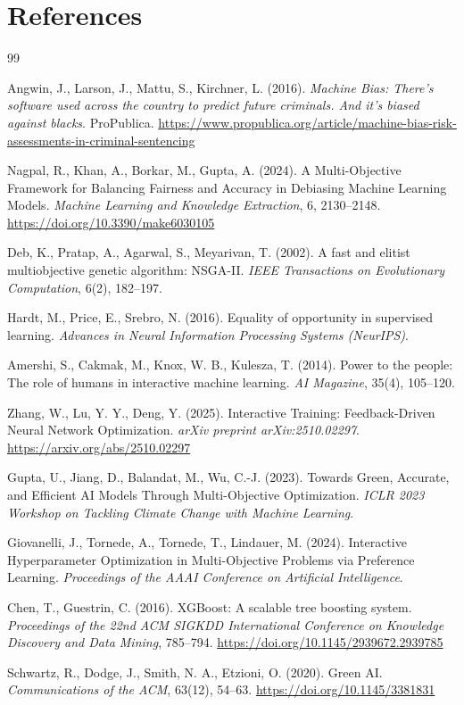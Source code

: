 \documentclass[12pt,a4paper]{article}
\begin{document}
\section*{References}
\begin{thebibliography}{99}

Angwin, J., Larson, J., Mattu, S., Kirchner, L. (2016).
\textit{Machine Bias: There's software used across the country to predict future criminals. And it's biased against blacks}.
ProPublica.
\url{https://www.propublica.org/article/machine-bias-risk-assessments-in-criminal-sentencing}

Nagpal, R., Khan, A., Borkar, M., Gupta, A. (2024).
A Multi-Objective Framework for Balancing Fairness and Accuracy in Debiasing Machine Learning Models.
\textit{Machine Learning and Knowledge Extraction}, 6, 2130--2148.
\url{https://doi.org/10.3390/make6030105}

Deb, K., Pratap, A., Agarwal, S., Meyarivan, T. (2002).
A fast and elitist multiobjective genetic algorithm: NSGA-II.
\textit{IEEE Transactions on Evolutionary Computation}, 6(2), 182--197.

Hardt, M., Price, E., Srebro, N. (2016).
Equality of opportunity in supervised learning.
\textit{Advances in Neural Information Processing Systems (NeurIPS)}.

Amershi, S., Cakmak, M., Knox, W. B., Kulesza, T. (2014).
Power to the people: The role of humans in interactive machine learning.
\textit{AI Magazine}, 35(4), 105--120.

Zhang, W., Lu, Y. Y., Deng, Y. (2025).
Interactive Training: Feedback-Driven Neural Network Optimization.
\textit{arXiv preprint arXiv:2510.02297}.
\url{https://arxiv.org/abs/2510.02297}

Gupta, U., Jiang, D., Balandat, M., Wu, C.-J. (2023).
Towards Green, Accurate, and Efficient AI Models Through Multi-Objective Optimization.
\textit{ICLR 2023 Workshop on Tackling Climate Change with Machine Learning}.

Giovanelli, J., Tornede, A., Tornede, T., Lindauer, M. (2024).
Interactive Hyperparameter Optimization in Multi-Objective Problems via Preference Learning.
\textit{Proceedings of the AAAI Conference on Artificial Intelligence}.

Chen, T., Guestrin, C. (2016).
XGBoost: A scalable tree boosting system.
\textit{Proceedings of the 22nd ACM SIGKDD International Conference on Knowledge Discovery and Data Mining}, 785--794.
\url{https://doi.org/10.1145/2939672.2939785}

Schwartz, R., Dodge, J., Smith, N. A., Etzioni, O. (2020).
Green AI.
\textit{Communications of the ACM}, 63(12), 54--63.
\url{https://doi.org/10.1145/3381831}

\end{thebibliography}
\newpage
\end{document}
